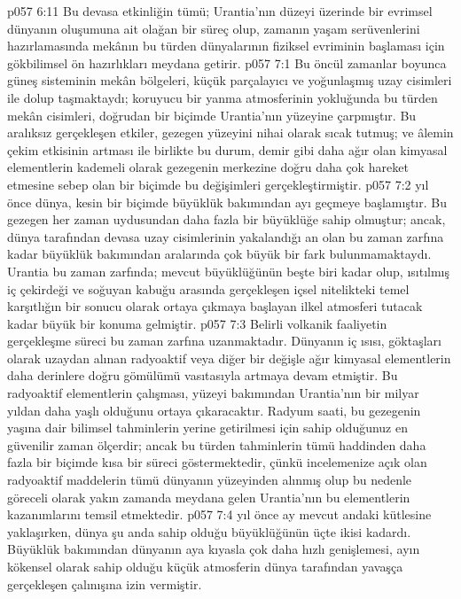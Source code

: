 \vs p057 6:11 Bu devasa etkinliğin tümü; Urantia’nın düzeyi üzerinde bir evrimsel dünyanın oluşumuna ait olağan bir süreç olup, zamanın yaşam serüvenlerini hazırlamasında mekânın bu türden dünyalarının fiziksel evriminin başlaması için gökbilimsel ön hazırlıkları meydana getirir.
\vs p057 7:1 Bu öncül zamanlar boyunca güneş sisteminin mekân bölgeleri, küçük parçalayıcı ve yoğunlaşmış uzay cisimleri ile dolup taşmaktaydı; koruyucu bir yanma atmosferinin yokluğunda bu türden mekân cisimleri, doğrudan bir biçimde Urantia’nın yüzeyine çarpmıştır. Bu aralıksız gerçekleşen etkiler, gezegen yüzeyini nihai olarak sıcak tutmuş; ve âlemin çekim etkisinin artması ile birlikte bu durum, demir gibi daha ağır olan kimyasal elementlerin kademeli olarak gezegenin merkezine doğru daha çok hareket etmesine sebep olan bir biçimde bu değişimleri gerçekleştirmiştir.
\vs p057 7:2  yıl önce dünya, kesin bir biçimde büyüklük bakımından ayı geçmeye başlamıştır. Bu gezegen her zaman uydusundan daha fazla bir büyüklüğe sahip olmuştur; ancak, dünya tarafından devasa uzay cisimlerinin yakalandığı an olan bu zaman zarfına kadar büyüklük bakımından aralarında çok büyük bir fark bulunmamaktaydı. Urantia bu zaman zarfında; mevcut büyüklüğünün beşte biri kadar olup, ısıtılmış iç çekirdeği ve soğuyan kabuğu arasında gerçekleşen içsel nitelikteki temel karşıtlığın bir sonucu olarak ortaya çıkmaya başlayan ilkel atmosferi tutacak kadar büyük bir konuma gelmiştir.
\vs p057 7:3 Belirli volkanik faaliyetin gerçekleşme süreci bu zaman zarfına uzanmaktadır. Dünyanın iç ısısı, göktaşları olarak uzaydan alınan radyoaktif veya diğer bir değişle ağır kimyasal elementlerin daha derinlere doğru gömülümü vasıtasıyla artmaya devam etmiştir. Bu radyoaktif elementlerin çalışması, yüzeyi bakımından Urantia’nın bir milyar yıldan daha yaşlı olduğunu ortaya çıkaracaktır. Radyum saati, bu gezegenin yaşına dair bilimsel tahminlerin yerine getirilmesi için sahip olduğunuz en güvenilir zaman ölçerdir; ancak bu türden tahminlerin tümü haddinden daha fazla bir biçimde kısa bir süreci göstermektedir, çünkü incelemenize açık olan radyoaktif maddelerin tümü dünyanın yüzeyinden alınmış olup bu nedenle göreceli olarak yakın zamanda meydana gelen Urantia’nın bu elementlerin kazanımlarını temsil etmektedir.
\vs p057 7:4  yıl önce ay mevcut andaki kütlesine yaklaşırken, dünya şu anda sahip olduğu büyüklüğünün üçte ikisi kadardı. Büyüklük bakımından dünyanın aya kıyasla çok daha hızlı genişlemesi, ayın kökensel olarak sahip olduğu küçük atmosferin dünya tarafından yavaşça gerçekleşen çalınışına izin vermiştir.
